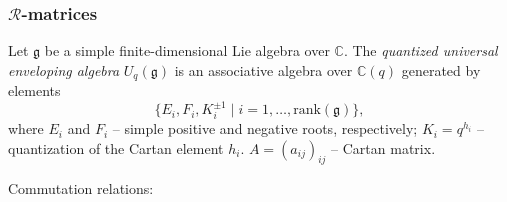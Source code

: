 \documentclass[12pt,a4paper]{article}
\begin{document}
\subsubsection{$\mathcal{R}$-matrices}
\begin{tcolorbox}
\begin{definition}
    Let $\mathfrak{g}$ be a simple finite-dimensional Lie algebra over $\mathbb{C}$. 
The \emph{quantized universal enveloping algebra} $U_q(\mathfrak{g})$ is an associative algebra over $\mathbb{C}(q)$ generated by elements
\[
\{ E_i, F_i, K_i^{\pm 1} \mid i = 1, \dots, \mathrm{rank}(\mathfrak{g}) \},\] 
where $E_i$ and $F_i$ -- simple positive and negative roots, respectively; $K_i = q^{h_i}$ -- quantization of the Cartan element $h_i$. $A = (a_{ij})_{ij}$ -- Cartan matrix.

Commutation relations:




\end{definition}
\end{tcolorbox}

\printbibliography
\end{document}

